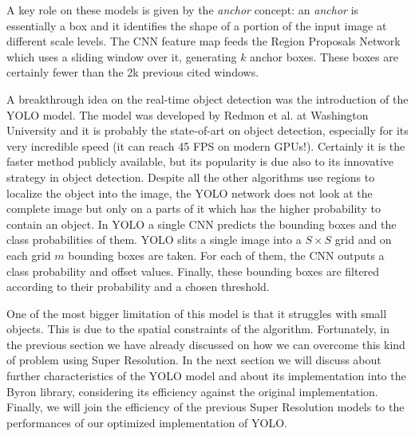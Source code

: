 \documentclass{standalone}
\begin{document}
A key role on these models is given by the \emph{anchor} concept: an \emph{anchor} is essentially a box and it identifies the shape of a portion of the input image at different scale levels.
The CNN feature map feeds the Region Proposals Network which uses a sliding window over it, generating $k$ anchor boxes.
These boxes are certainly fewer than the 2k previous cited windows.

A breakthrough idea on the real-time object detection was the introduction of the YOLO model.
The model was developed by Redmon et al. at Washington University and it is probably the state-of-art on object detection, especially for its very incredible speed (it can reach 45 FPS on modern GPUs!).
Certainly it is the faster method publicly available, but its popularity is due also to its innovative strategy in object detection.
Despite all the other algorithms use regions to localize the object into the image, the YOLO network does not look at the complete image but only on a parts of it which has the higher probability to contain an object.
In YOLO a single CNN predicts the bounding boxes and the class probabilities of them.
YOLO slits a single image into a $S\times S$ grid and on each grid $m$ bounding boxes are taken.
For each of them, the CNN outputs a class probability and offset values.
Finally, these bounding boxes are filtered according to their probability and a chosen threshold.

One of the most bigger limitation of this model is that it struggles with small objects.
This is due to the spatial constraints of the algorithm.
Fortunately, in the previous section we have already discussed on how we can overcome this kind of problem using Super Resolution.
In the next section we will discuss about further characteristics of the YOLO model and about its implementation into the \textsf{Byron} library, considering its efficiency against the original implementation.
Finally, we will join the efficiency of the previous Super Resolution models to the performances of our optimized implementation of YOLO.


\end{document}

